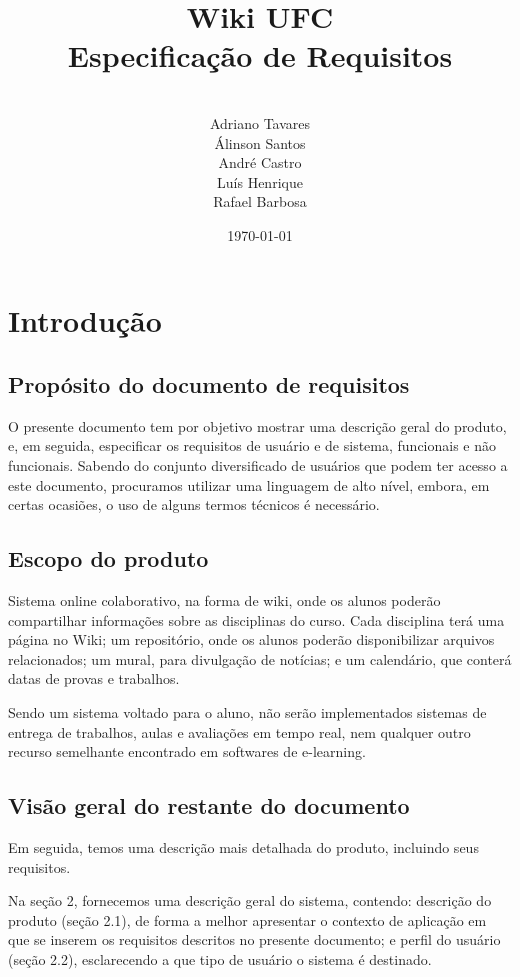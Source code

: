 \documentclass[11pt]{article}
\title{\vspace{8em} \huge{Wiki UFC} \\ \vspace{0.1em} \small{Especificação de Requisitos}}
\author{
	\vspace{5em} \\
	\small{Adriano Tavares} \\
	\small{Álinson Santos}  \\
	\small{André Castro}    \\
	\small{Luís Henrique}   \\
	\small{Rafael Barbosa}
}
\date{\today}
\begin{document}
\maketitle
\pagebreak

\tableofcontents
\pagebreak

\section{Introdução}
\subsection{Propósito do documento de requisitos}

O presente documento tem por objetivo mostrar uma descrição geral do produto, e, em seguida, especificar os requisitos de usuário e de sistema, funcionais e não funcionais. Sabendo do conjunto diversificado de usuários que podem ter acesso a este documento, procuramos utilizar uma linguagem de alto nível, embora, em certas ocasiões, o uso de alguns termos técnicos é necessário.

\subsection{Escopo do produto}

Sistema online colaborativo, na forma de wiki, onde os alunos poderão compartilhar informações sobre as disciplinas do curso. Cada disciplina terá uma página no Wiki; um repositório, onde os alunos poderão disponibilizar arquivos relacionados; um mural, para divulgação de notícias; e um calendário, que conterá datas de provas e trabalhos.

Sendo um sistema voltado para o aluno, não serão implementados sistemas de entrega de trabalhos, aulas e avaliações em tempo real, nem qualquer outro recurso semelhante encontrado em softwares de e-learning.

\subsection{Visão geral do restante do documento}

Em seguida, temos uma descrição mais detalhada do produto, incluindo seus requisitos.

Na seção 2, fornecemos uma descrição geral do sistema, contendo: descrição do produto (seção 2.1), de forma a melhor apresentar o contexto de aplicação em que se inserem os requisitos descritos no presente documento; e perfil do usuário (seção 2.2), esclarecendo a que tipo de usuário o sistema é destinado.
\end{document}
